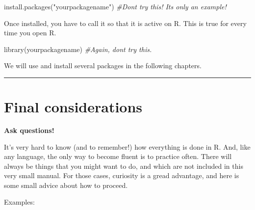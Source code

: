 \documentclass[
]{book}
\newenvironment{Shaded}{\begin{snugshade}}{\end{snugshade}}
\newcommand{\CommentTok}[1]{\textcolor[rgb]{0.56,0.35,0.01}{\textit{#1}}}
\newcommand{\FunctionTok}[1]{\textcolor[rgb]{0.00,0.00,0.00}{#1}}
\newcommand{\NormalTok}[1]{#1}
\newcommand{\StringTok}[1]{\textcolor[rgb]{0.31,0.60,0.02}{#1}}
\begin{document}
\begin{Shaded}
\begin{Highlighting}[]
\FunctionTok{install.packages}\NormalTok{(}\StringTok{"yourpackagename"}\NormalTok{)}
\CommentTok{\#Don\textquotesingle{}t try this! It\textquotesingle{}s only an example!}
\end{Highlighting}
\end{Shaded}

Once installed, you have to call it so that it is active on R. This is true for every time you open R.

\begin{Shaded}
\begin{Highlighting}[]
\FunctionTok{library}\NormalTok{(yourpackagename)}
\CommentTok{\#Again, don\textquotesingle{}t try this.}
\end{Highlighting}
\end{Shaded}

We will use and install several packages in the following chapters.

\begin{center}\rule{0.5\linewidth}{0.5pt}\end{center}

\hypertarget{final-considerations}{%
\section{Final considerations}\label{final-considerations}}

\textbf{Ask questions!}

It's very hard to know (and to remember!) how everything is done in R. And, like any language, the only way to become fluent is to practice often. There will always be things that you might want to do, and which are not included in this very small manual. For those cases, curiosity is a gread advantage, and here is some small advice about how to proceed.

Examples:
\end{document}
